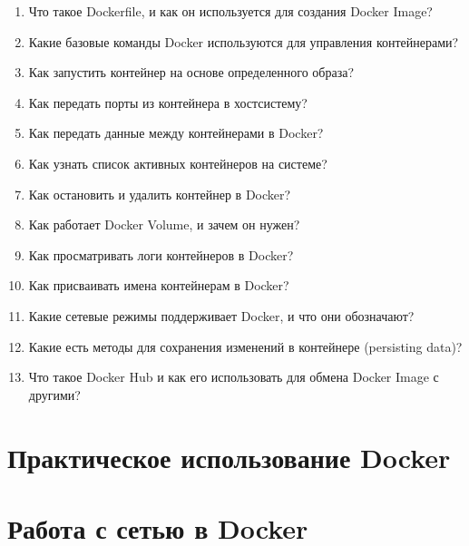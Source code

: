 \documentclass[letterpaper,10pt,russian]{sphinxmanual}
\begin{document}
\begin{enumerate}
\item {} 
\sphinxAtStartPar
Что такое Dockerfile, и как он используется для создания Docker Image?

\item {} 
\sphinxAtStartPar
Какие базовые команды Docker используются для управления контейнерами?

\item {} 
\sphinxAtStartPar
Как запустить контейнер на основе определенного образа?

\item {} 
\sphinxAtStartPar
Как передать порты из контейнера в хост\sphinxhyphen{}систему?

\item {} 
\sphinxAtStartPar
Как передать данные между контейнерами в Docker?

\item {} 
\sphinxAtStartPar
Как узнать список активных контейнеров на системе?

\item {} 
\sphinxAtStartPar
Как остановить и удалить контейнер в Docker?

\item {} 
\sphinxAtStartPar
Как работает Docker Volume, и зачем он нужен?

\item {} 
\sphinxAtStartPar
Как просматривать логи контейнеров в Docker?

\item {} 
\sphinxAtStartPar
Как присваивать имена контейнерам в Docker?

\item {} 
\sphinxAtStartPar
Какие сетевые режимы поддерживает Docker, и что они обозначают?

\item {} 
\sphinxAtStartPar
Какие есть методы для сохранения изменений в контейнере (persisting data)?

\item {} 
\sphinxAtStartPar
Что такое Docker Hub и как его использовать для обмена Docker Image с другими?

\end{enumerate}


\chapter{Практическое использование Docker}
\label{\detokenize{index:docker}}

\chapter{Работа с сетью в Docker}
\label{\detokenize{index:id16}}
\sphinxstepscope
\end{document}
